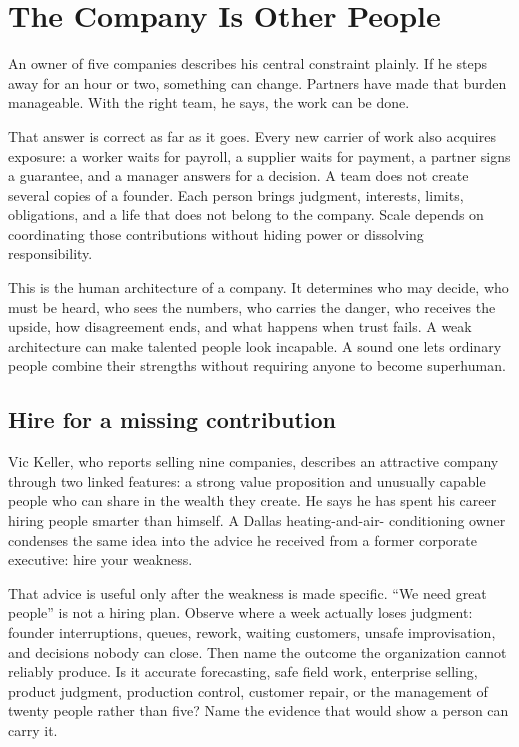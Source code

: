 \chapter{The Company Is Other People}

An owner of five companies describes his central constraint plainly. If he
steps away for an hour or two, something can change. Partners have made that
burden manageable. With the right team, he says, the work can be done.

That answer is correct as far as it goes. Every new carrier of work also
acquires exposure: a worker waits for payroll, a supplier waits for payment, a
partner signs a guarantee, and a manager answers for a decision. A team does
not create several copies of a founder. Each person brings judgment, interests,
limits, obligations, and a life that does not belong to the company. Scale
depends on coordinating those contributions without hiding power or dissolving
responsibility.

This is the human architecture of a company. It determines who may decide, who
must be heard, who sees the numbers, who carries the danger, who receives the
upside, how disagreement ends, and what happens when trust fails. A weak
architecture can make talented people look incapable. A sound one lets
ordinary people combine their strengths without requiring anyone to become
superhuman.

\section{Hire for a missing contribution}

Vic Keller, who reports selling nine companies, describes an attractive
company through two linked features: a strong value proposition and unusually
capable people who can share in the wealth they create. He says he has spent
his career hiring people smarter than himself. A Dallas heating-and-air-
conditioning owner condenses the same idea into the advice he received from a
former corporate executive: hire your weakness.

That advice is useful only after the weakness is made specific. ``We need great
people'' is not a hiring plan. Observe where a week actually loses judgment:
founder interruptions, queues, rework, waiting customers, unsafe improvisation,
and decisions nobody can close. Then name the outcome the organization cannot
reliably produce. Is it accurate forecasting, safe field work, enterprise
selling, product judgment, production control, customer repair, or the
management of twenty people rather than five? Name the evidence that would show
a person can carry it.

